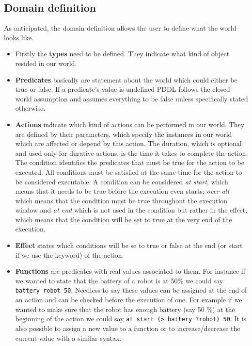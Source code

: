\subsection{Domain definition}
As anticipated, the domain definition allows the user to define what the world looks like. 
\begin{itemize}
    \item Firstly the \textbf{types} need to be defined. They indicate what kind of object resided in our world. 
    \item \textbf{Predicates} basically are statement about the world which could either be true or false. If a predicate's value is undefined PDDL follows the closed world assumption and assumes everything to be false unless specifically stated otherwise.
    \item \textbf{Actions} indicate which kind of actions can be performed in our world. They are defined by their parameters, which specify the instances in our world which are affected or depend by this action. The duration, which is optional and used only for durative actions, is the time it takes to complete the action. The condition identifies the predicates that must be true for the action to be executed. All conditions must be satisfied at the same time for the action to be considered executable. A condition can be considered \emph{at start}, which means that it needs to be true before the execution even starts; \emph{over all} which means that the condition must be true throughout the execution window and \emph{at end} which is not used in the condition but rather in the effect, which means that the condition will be set to true at the very end of the execution.
    \item \textbf{Effect} states which conditions will be se to true or false at the end (or start if we use the keyword) of the action.
    \item \textbf{Functions} are predicates with real values associated to them. For instance if we wanted to state that the battery of a robot is at 50\% we could say \texttt{battery robot 50}. Needless to say these values can be assigned at the end of an action and can be checked before the execution of one. For example if we wanted to make sure that the robot has enough battery (say 50 \%) at the beginning of the action we could say \texttt{at start (> battery ?robot) 50}. It is also possible to assign a new value to a function or to increase/decrease the current value with a similar syntax.
\end{itemize} 
